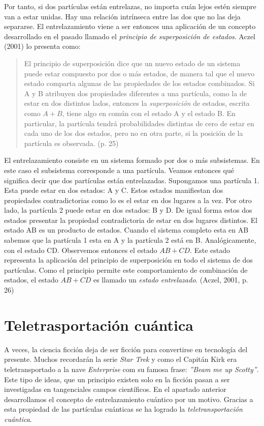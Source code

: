 \documentclass[11pt,a4paper]{article}
\begin{document}
Por tanto, si dos partículas están entrelazas, no importa cuán lejos estén siempre van a estar unidas. Hay una relación intrínseca entre las dos que no las deja separarse. El entrelazamiento viene a ser entonces una aplicación de un concepto desarrollado en el pasado llamado el \textit{principio de superposición de estados}. Aczel (2001) lo presenta como:
\begin{quote}
El principio de superposición dice que un nuevo estado de un sistema puede estar compuesto por dos o más estados, de manera tal que el nuevo estado comparta algunas de las propiedades de los estados combinados. Si A y B atribuyen dos propiedades diferentes a una partícula, como la de estar en dos distintos lados, entonces la \textit{superposición} de estados, escrita como $A + B$, tiene algo en común con el estado A y el estado B. En particular, la partícula tendrá probabilidades distintas de cero de estar en cada uno de los dos estados, pero no en otra parte, si la posición de la partícula es observada. (p. 25)
\end{quote}
El entrelazamiento consiste en un sistema formado por dos o más subsistemas. En este caso el subsistema corresponde a una partícula. Veamos entonces qué significa decir que dos partículas están entrelazadas. Supongamos una partícula 1. Esta puede estar en dos estados: A y C. Estos estados manifiestan dos propiedades contradictorias como lo es el estar en dos lugares a la vez. Por otro lado, la partícula 2 puede estar en dos estados: B y D. De igual forma estos dos estados presentar la propiedad contradictoria de estar en dos lugares distintos. El estado AB es un producto de estados. Cuando el sistema completo esta en AB sabemos que la partícula 1 esta en A y la partícula 2 está en B. Analógicamente, con el estado CD. Observemos entonces el estado $AB + CD$. Este estado representa la aplicación del principio de superposición en todo el sistema de dos partículas. Como el principio permite este comportamiento de combinación de estados, el estado $AB + CD$ es llamado un \textit{estado entrelazado}. (Aczel, 2001, p. 26)

\section*{Teletrasportación cuántica}

A veces, la ciencia ficción deja de ser ficción para convertirse en tecnología del presente. Muchos recordarán la serie \textit{Star Trek} y como el Capitán Kirk era teletransportado a la nave \textit{Enterprise} com su famosa frase: \textit{''Beam me up Scotty''}. Este tipo de ideas, que un principio existen solo en la ficción pasan a ser investigadas en tangenciales campos científicos. En el apartado anterior desarrollamos el concepto de entrelazamiento cuántico por un motivo. Gracias a esta propiedad de las partículas cuánticas se ha logrado la \textit{teletransportación cuántica}. 
\end{document}
